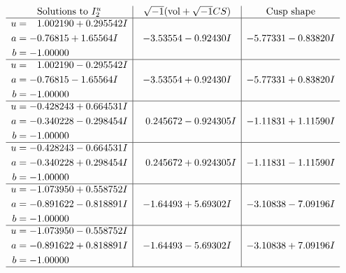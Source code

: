\documentclass[1p]{elsarticle_modified}
\theoremstyle{definition}
\newcommand{\I}{\sqrt{-1}}
\begin{document}
$$\begin{array}{c|c|c}  
\text{Solutions to }I^u_{2}& \I (\text{vol} + \sqrt{-1}CS) & \text{Cusp shape}\\
 \hline 
\begin{aligned}
u &= \phantom{-}1.002190 + 0.295542 I \\
a &= -0.76815 + 1.65564 I \\
b &= -1.00000\phantom{ +0.000000I}\end{aligned}
 & -3.53554 - 0.92430 I & -5.77331 - 0.83820 I \\ \hline\begin{aligned}
u &= \phantom{-}1.002190 - 0.295542 I \\
a &= -0.76815 - 1.65564 I \\
b &= -1.00000\phantom{ +0.000000I}\end{aligned}
 & -3.53554 + 0.92430 I & -5.77331 + 0.83820 I \\ \hline\begin{aligned}
u &= -0.428243 + 0.664531 I \\
a &= -0.340228 - 0.298454 I \\
b &= -1.00000\phantom{ +0.000000I}\end{aligned}
 & \phantom{-}0.245672 - 0.924305 I & -1.11831 + 1.11590 I \\ \hline\begin{aligned}
u &= -0.428243 - 0.664531 I \\
a &= -0.340228 + 0.298454 I \\
b &= -1.00000\phantom{ +0.000000I}\end{aligned}
 & \phantom{-}0.245672 + 0.924305 I & -1.11831 - 1.11590 I \\ \hline\begin{aligned}
u &= -1.073950 + 0.558752 I \\
a &= -0.891622 - 0.818891 I \\
b &= -1.00000\phantom{ +0.000000I}\end{aligned}
 & -1.64493 + 5.69302 I & -3.10838 - 7.09196 I \\ \hline\begin{aligned}
u &= -1.073950 - 0.558752 I \\
a &= -0.891622 + 0.818891 I \\
b &= -1.00000\phantom{ +0.000000I}\end{aligned}
 & -1.64493 - 5.69302 I & -3.10838 + 7.09196 I\\
 \hline 
 \end{array}$$\newpage
\newpage\renewcommand{\arraystretch}{1}
\end{document}
